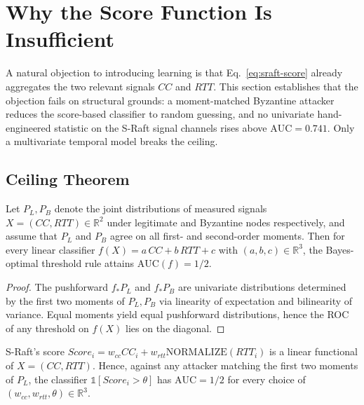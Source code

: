 
\section{Why the Score Function Is Insufficient}
\label{sec:why-ai}

A natural objection to introducing learning is that
Eq.~\eqref{eq:sraft-score} already aggregates the two relevant signals
$CC$ and $RTT$. This section establishes that the objection fails on
structural grounds: a moment-matched Byzantine attacker reduces the
score-based classifier to random guessing, and no univariate
hand-engineered statistic on the S-Raft signal channels rises above
$\mathrm{AUC}=0.741$. Only a multivariate temporal model breaks the
ceiling.

\subsection{Ceiling Theorem}
\label{sec:ceiling}

\begin{theorem}
\label{thm:ceiling}
Let $P_L,P_B$ denote the joint distributions of measured signals
$X=(CC,RTT)\in\mathbb{R}^2$ under legitimate and Byzantine nodes
respectively, and assume that $P_L$ and $P_B$ agree on all first- and
second-order moments. Then for every linear classifier
$f(X)=a\,CC+b\,RTT+c$ with $(a,b,c)\in\mathbb{R}^3$, the Bayes-optimal
threshold rule attains $\mathrm{AUC}(f)=1/2$.
\end{theorem}

\begin{proof}
The pushforward $f_\ast P_L$ and $f_\ast P_B$ are univariate
distributions determined by the first two moments of $P_L,P_B$ via
linearity of expectation and bilinearity of variance. Equal moments
yield equal pushforward distributions, hence the ROC of any threshold
on $f(X)$ lies on the diagonal.
\end{proof}

\begin{corollary}
\label{cor:score-insufficient}
S-Raft's score $Score_i=w_{cc} CC_i + w_{rtt} \mathrm{NORMALIZE}(RTT_i)$
is a linear functional of $X=(CC,RTT)$. Hence, against any attacker
matching the first two moments of $P_L$, the classifier
$\mathbb{1}[Score_i>\theta]$ has $\mathrm{AUC}=1/2$ for every choice of
$(w_{cc},w_{rtt},\theta)\in\mathbb{R}^3$.
\end{corollary}

